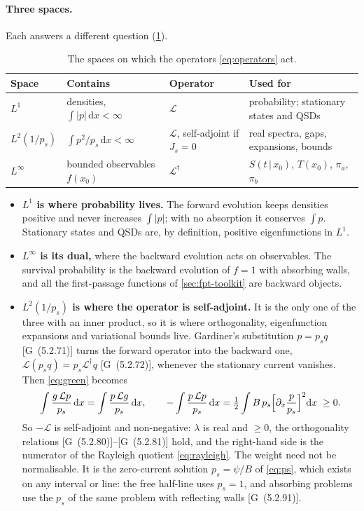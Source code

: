\documentclass[11pt]{article}
\numberwithin{equation}{section}
\newcommand{\dd}{\mathrm{d}}
\newcommand{\given}{\,|\,}
\newcommand{\G}[1]{[G~(#1)]}
\begin{document}
\paragraph{Three spaces.} Each answers a different question (\cref{tab:spaces}).
\begin{table}[h]
\centering
\small
\renewcommand{\arraystretch}{1.3}
\begin{tabular}{@{}l l l l@{}}
\toprule
Space & Contains & Operator & Used for \\
\midrule
$L^1$ & densities, $\int|p|\,\dd x<\infty$ & $\mathcal L$ & probability; stationary states and QSDs \\
$L^2(1/p_s)$ & $\int p^2/p_s\,\dd x<\infty$ & $\mathcal L$, self-adjoint if $J_s=0$ & real spectra, gaps, expansions, bounds \\
$L^\infty$ & bounded observables $f(x_0)$ & $\mathcal L^\dagger$ & $S(t\given x_0)$, $T(x_0)$, $\pi_a$, $\pi_b$ \\
\bottomrule
\end{tabular}
\caption{The spaces on which the operators \cref{eq:operators} act.}
\label{tab:spaces}
\end{table}
\begin{itemize}
  \item \textbf{$L^1$ is where probability lives.} The forward evolution keeps densities positive and never
        increases $\int|p|$; with no absorption it conserves $\int p$. Stationary states and QSDs are, by
        definition, positive eigenfunctions in $L^1$.
  \item \textbf{$L^\infty$ is its dual,} where the backward evolution acts on observables. The survival
        probability is the backward evolution of $f=1$ with absorbing walls, and all the first-passage functions
        of \cref{sec:fpt-toolkit} are backward objects.
  \item \textbf{$L^2(1/p_s)$ is where the operator is self-adjoint.} It is the only one of the three with an inner
        product, so it is where orthogonality, eigenfunction expansions and variational bounds live. Gardiner's
        substitution $p=p_sq$ \G{5.2.71} turns the forward operator into the backward one,
        $\mathcal L(p_sq)=p_s\mathcal L^\dagger q$ \G{5.2.72}, whenever the stationary current vanishes. Then
        \cref{eq:green} becomes
        \begin{equation}
          \int\frac{g\,\mathcal Lp}{p_s}\,\dd x=\int\frac{p\,\mathcal Lg}{p_s}\,\dd x,\qquad
          -\int\frac{p\,\mathcal Lp}{p_s}\,\dd x=\tfrac12\int B\,p_s\Bigl[\partial_x\frac{p}{p_s}\Bigr]^2\dd x\;\ge0 .
          \label{eq:dirichlet}
        \end{equation}
        So $-\mathcal L$ is self-adjoint and non-negative: $\lambda$ is real and $\ge0$, the orthogonality
        relations \G{5.2.80}--\G{5.2.81} hold, and the right-hand side is the numerator of the Rayleigh quotient
        \cref{eq:rayleigh}. The weight need not be normalisable. It is the zero-current solution
        $p_s=\psi/B$ of \cref{eq:ps}, which exists on any interval or line: the free half-line uses $p_s=1$, and
        absorbing problems use the $p_s$ of the same problem with reflecting walls \G{5.2.91}.
\end{itemize}
\end{document}
